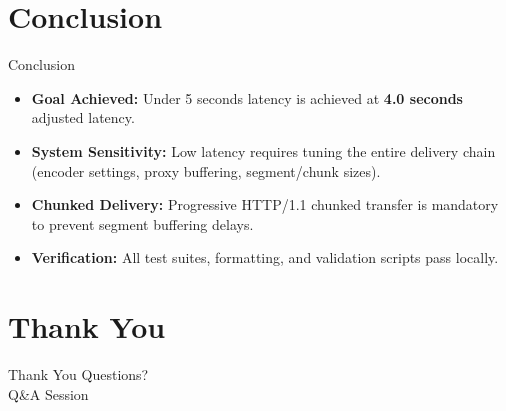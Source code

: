 \documentclass{beamer}
\begin{document}
\section{Conclusion}

\begin{frame}{Conclusion}
    \begin{itemize}
        \item \textbf{Goal Achieved:} Under 5 seconds latency is achieved at \textbf{4.0 seconds} adjusted latency.
        \item \textbf{System Sensitivity:} Low latency requires tuning the entire delivery chain (encoder settings, proxy buffering, segment/chunk sizes).
        \item \textbf{Chunked Delivery:} Progressive HTTP/1.1 chunked transfer is mandatory to prevent segment buffering delays.
        \item \textbf{Verification:} All test suites, formatting, and validation scripts pass locally.
    \end{itemize}
\end{frame}

\section*{Thank You}

\begin{frame}{Thank You}
    \centering
    \vspace{1.0cm}
    \Huge Questions?
    \vspace{0.5cm}
    \Large \\ Q&A Session
\end{frame}
\end{document}
